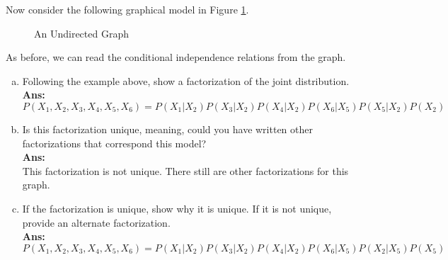 \documentclass[11pt]{article}
\begin{document}
Now consider the following graphical model in Figure \ref{fig:utm}.
\begin{figure}[h]
	\begin{center}
		\caption{An Undirected Graph}
			\label{fig:utm}
		\end{center}
\end{figure}

As before, we can read the conditional independence relations from the graph. 
\begin{enumerate}[(a)]
\item Following the example above, show a factorization of the joint distribution.\\
\textbf{Ans:}\\
$P(X_1, X_2, X_3, X_4, X_5, X_6) = P(X_1 | X_2)P(X_3 | X_2)P(X_4 | X_2)P(X_6 | X_5)P(X_5 | X_2)P(X_2)$

\item Is this factorization unique, meaning, could you have written other factorizations that correspond this model?\\
\textbf{Ans:}\\
This factorization is not unique. There still are other factorizations for this graph.

\item If the factorization is unique, show why it is unique. If it is not unique, provide an alternate factorization.\\
\textbf{Ans:}\\
$P(X_1, X_2, X_3, X_4, X_5, X_6) = P(X_1 | X_2)P(X_3 | X_2)P(X_4 | X_2)P(X_6 | X_5)P(X_2 | X_5)P(X_5)$
\end{enumerate}
\end{document}

